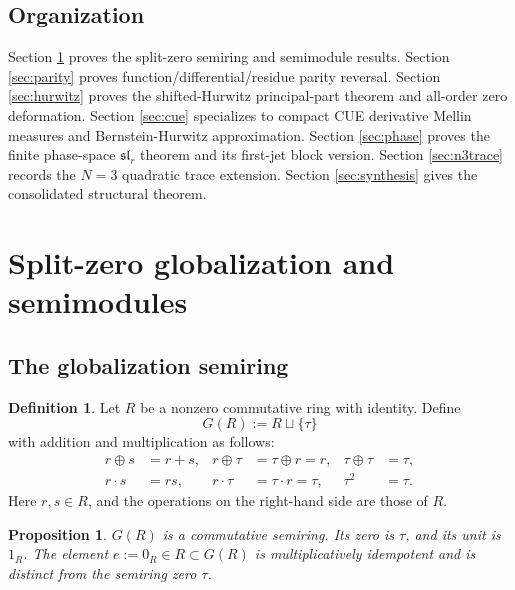 \documentclass[11pt]{article}
\theoremstyle{plain}
\newtheorem{proposition}[theorem]{Proposition}
\theoremstyle{definition}
\newtheorem{definition}[theorem]{Definition}
\numberwithin{equation}{section}
\begin{document}
\subsection{Organization}

Section \ref{sec:splitzero} proves the split-zero semiring and semimodule results.  Section \ref{sec:parity} proves function/differential/residue parity reversal.  Section \ref{sec:hurwitz} proves the shifted-Hurwitz principal-part theorem and all-order zero deformation.  Section \ref{sec:cue} specializes to compact CUE derivative Mellin measures and Bernstein-Hurwitz approximation.  Section \ref{sec:phase} proves the finite phase-space \(\mathfrak{sl}_r\) theorem and its first-jet block version.  Section \ref{sec:n3trace} records the \(N=3\) quadratic trace extension.  Section \ref{sec:synthesis} gives the consolidated structural theorem.

\section{Split-zero globalization and semimodules}\label{sec:splitzero}

\subsection{The globalization semiring}

\begin{definition}
Let \(R\) be a nonzero commutative ring with identity.  Define
\[
 G(R):=R\sqcup\{\tau\}
\]
with addition and multiplication as follows:
\begin{align}
 r\oplus s&=r+s, & r\oplus\tau&=\tau\oplus r=r, & \tau\oplus\tau&=\tau,\label{eq:Gadd}\\
 r\cdot s&=rs, & r\cdot\tau&=\tau\cdot r=\tau, & \tau^2&=\tau.\label{eq:Gmult}
\end{align}
Here \(r,s\in R\), and the operations on the right-hand side are those of \(R\).
\end{definition}

\begin{proposition}
\(G(R)\) is a commutative semiring.  Its zero is \(\tau\), and its unit is \(1_R\).  The element \(e:=0_R\in R\subset G(R)\) is multiplicatively idempotent and is distinct from the semiring zero \(\tau\).
\end{proposition}
\end{document}
